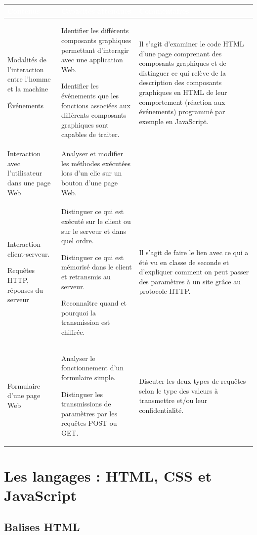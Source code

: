 {\centering\begin{tabular}{|L{3cm}|L{5.5cm}|L{6cm}|}\hline
{}\bfseries\textcolor{white}{Contenus}&
\bfseries\textcolor{white}{Capacités attendues}&
\bfseries\textcolor{white}{Commentaires}\\ \hline
Modalités de l'interaction entre l'homme et la machine

Événements
&
Identifier les différents composants graphiques permettant d'interagir avec une application Web.

Identifier les événements que les fonctions associées aux différents composants graphiques sont capables de traiter.
&
Il s'agit d'examiner le code HTML d'une page comprenant des composants graphiques et de distinguer ce qui relève de la description des composants graphiques en HTML de leur comportement (réaction aux événements) programmé par exemple en JavaScript.\\ \hline
Interaction avec l'utilisateur dans une page Web
&
Analyser et modifier les méthodes exécutées lors d'un clic sur un bouton d'une page Web.
&
\\ \hline
Interaction client-serveur.

Requêtes HTTP, réponses du serveur
&
Distinguer ce qui est exécuté sur le client ou sur le serveur et dans quel ordre.

Distinguer ce qui est mémorisé dans le client et retransmis au serveur.

Reconnaître quand et pourquoi la transmission est chiffrée.
&
Il s'agit de faire le lien avec ce qui a été vu en classe de seconde et d'expliquer comment on peut passer des paramètres à un site grâce au protocole HTTP.\\ \hline
Formulaire d'une page Web
&
Analyser le fonctionnement d'un formulaire simple.

Distinguer les transmissions de paramètres par les requêtes POST ou GET.
&
Discuter les deux types de requêtes selon le type des valeurs à transmettre et/ou leur confidentialité.\\ \hline
\end{tabular}\par}


\chapter{Les langages : HTML, CSS et JavaScript}

\section{Balises HTML}

